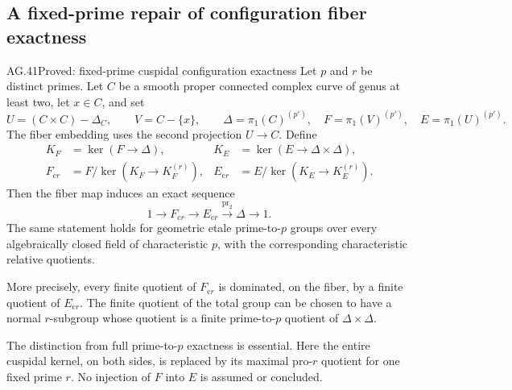 \subsection{A fixed-prime repair of configuration fiber exactness}

\begin{claim}{AG.41}{Proved: fixed-prime cuspidal configuration exactness}
\label{clm:AGfixedrconfiguration}
Let \(p\) and \(r\) be distinct primes. Let \(C\) be a
smooth proper connected complex curve of genus at least two,
let \(x\in C\), and set
\[
 U=(C\times C)-\Delta_C,\qquad V=C-\{x\},\qquad
 \Delta=\pi_1(C)^{(p')},\quad F=\pi_1(V)^{(p')},\quad
 E=\pi_1(U)^{(p')}.
                                                        \tag{AG.41.1}
\]
The fiber embedding uses the second projection \(U\to C\).
Define
\[
\begin{aligned}
 K_F&=\ker(F\to\Delta),
 &K_E&=\ker(E\to\Delta\times\Delta),\\
 F_{\mathrm{c}r}&=F/\ker(K_F\to K_F^{(r)}),
 &E_{\mathrm{c}r}&=E/\ker(K_E\to K_E^{(r)}).
\end{aligned}
                                                        \tag{AG.41.2}
\]
Then the fiber map induces an exact sequence
\[
 1\longrightarrow F_{\mathrm{c}r}
 \longrightarrow E_{\mathrm{c}r}
 \xrightarrow{\mathrm{pr}_2}\Delta\longrightarrow1.
                                                        \tag{AG.41.3}
\]
The same statement holds for geometric etale prime-to-\(p\)
groups over every algebraically closed field of characteristic
\(p\), with the corresponding characteristic relative quotients.

More precisely, every finite quotient of \(F_{\mathrm{c}r}\)
is dominated, on the fiber, by a finite quotient of
\(E_{\mathrm{c}r}\). The finite quotient of the total group
can be chosen to have a normal \(r\)-subgroup whose quotient
is a finite prime-to-\(p\) quotient of
\(\Delta\times\Delta\).
\end{claim}

The distinction from full prime-to-\(p\) exactness is essential.
Here the entire cuspidal kernel, on both sides, is replaced by
its maximal pro-\(r\) quotient for one fixed prime \(r\).
No injection of \(F\) into \(E\) is assumed or concluded.

